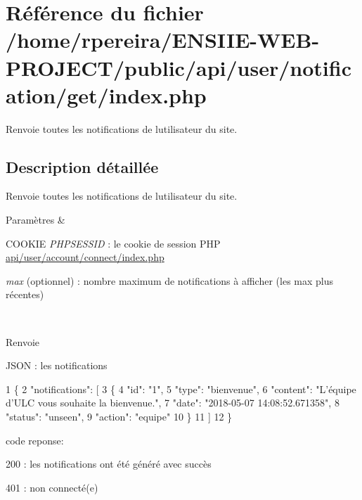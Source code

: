 \hypertarget{notification_2get_2index_8php}{}\section{Référence du fichier /home/rpereira/\+E\+N\+S\+I\+I\+E-\/\+W\+E\+B-\/\+P\+R\+O\+J\+E\+C\+T/public/api/user/notification/get/index.php}
\label{notification_2get_2index_8php}


Renvoie toutes les notifications de l\textquotesingle{}utilisateur du site.  




\subsection{Description détaillée}
Renvoie toutes les notifications de l\textquotesingle{}utilisateur du site. 


\begin{DoxyParams}{Paramètres}
{\em } & 
\begin{DoxyItemize}
\item C\+O\+O\+K\+IE {\itshape P\+H\+P\+S\+E\+S\+S\+ID} \+: le cookie de session P\+HP \hyperlink{account_2connect_2index_8php}{api/user/account/connect/index.\+php}
\item {\itshape max} (optionnel) \+: nombre maximum de notifications à afficher (les \textquotesingle{}max\textquotesingle{} plus récentes) 
\end{DoxyItemize}\\
\hline
\end{DoxyParams}
\begin{DoxyReturn}{Renvoie}

\begin{DoxyItemize}
\item J\+S\+ON \+: les notifications 
\begin{DoxyCode}
1 \{
2     "notifications": [
3       \{
4             "id": "1",
5             "type": "bienvenue",
6             "content": "L'équipe d'ULC vous souhaite la bienvenue.",
7             "date": "2018-05-07 14:08:52.671358",
8             "status": "unseen",
9             "action": "equipe"
10         \}
11     ]
12 \}
\end{DoxyCode}

\item code reponse\+:
\begin{DoxyItemize}
\item 200 \+: les notifications ont été généré avec succès
\item 401 \+: non connecté(e) 
\end{DoxyItemize}
\end{DoxyItemize}
\end{DoxyReturn}
